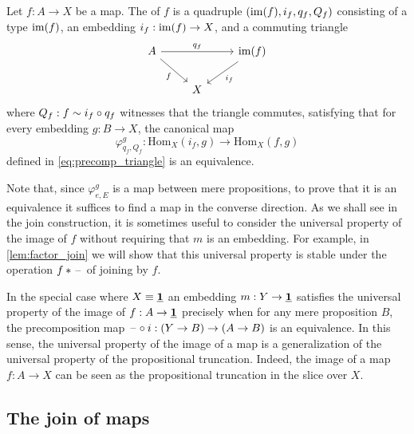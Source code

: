 \begin{defn}\label{defn:universal}
Let $f:A\to X$ be a map. The  of $f$ is a quadruple $(\operatorname{im}(f),i_f,q_f,Q_f)$
consisting of a type $\operatorname{im}(f)$, an embedding $i_f:\operatorname{im}(f)\to X$, and a commuting triangle
\begin{equation*}
\begin{tikzcd}
A \arrow[rr,"q_f"] \arrow[dr,swap,"f"] & & \im(f) \arrow[dl,"{i_f}"] \\
& X
\end{tikzcd}
\end{equation*}
where $Q_f:f\sim i_f\circ q_f$ witnesses that the triangle commutes, satisfying 
 that for
every embedding $g:B\to X$, the canonical map
\begin{equation*}
\varphi^g_{q_f,Q_f} : \mathrm{Hom}_X(i_f,g)\to\mathrm{Hom}_X(f,g)
\end{equation*}
defined in \autoref{eq:precomp_triangle} is an equivalence.
\end{defn}

Note that, since $\varphi^g_{e,E}$ is a map between mere propositions, to prove
that it is an equivalence it suffices to find a map in the converse direction.
As we shall see in the join construction, it is sometimes useful to consider
the universal property of the image of $f$ without requiring that $m$ is an
embedding. For example, in \autoref{lem:factor_join}
we will show that this universal property is stable under the operation ${f}\ast_{}{\mathord{\hspace{1pt}\text{--}\hspace{1pt}}}$
of joining by $f$. 

In the special case where $X\equiv \underline{\mathbf{1}}$ an embedding $m:Y\to \underline{\mathbf{1}}$ satisfies
the universal property of the image of $f:A\to \underline{\mathbf{1}}$ precisely when for any
mere proposition $B$, the precomposition map $\mathord{\hspace{1pt}\text{--}\hspace{1pt}}\circ i : (Y\to B)\to(A\to B)$
is an equivalence. In this sense, the universal property of the image of a map
is a generalization of the universal property of the propositional truncation.
Indeed, the image of a map $f:A\to X$ can be seen as the propositional truncation
in the slice over $X$.

\subsection{The join of maps}\label{sec:join-maps}

